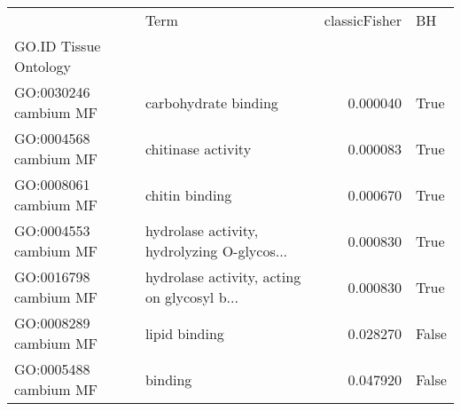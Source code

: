 \begin{tabular}{llrl}
\toprule
{} &                                         Term &  classicFisher &     BH \\
GO.ID      Tissue  Ontology &                                              &                &        \\
GO:0030246 cambium MF       &                         carbohydrate binding &       0.000040 &   True \\
\midrule
GO:0004568 cambium MF       &                           chitinase activity &       0.000083 &   True \\
GO:0008061 cambium MF       &                               chitin binding &       0.000670 &   True \\
GO:0004553 cambium MF       &  hydrolase activity, hydrolyzing O-glycos... &       0.000830 &   True \\
GO:0016798 cambium MF       &  hydrolase activity, acting on glycosyl b... &       0.000830 &   True \\
GO:0008289 cambium MF       &                                lipid binding &       0.028270 &  False \\
GO:0005488 cambium MF       &                                      binding &       0.047920 &  False \\
\bottomrule
\end{tabular}
